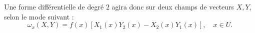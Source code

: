 Une forme différentielle de degré $2$ agira donc sur deux champs de vecteurs $X, Y$, selon le mode suivant :
\[\omega_x(X,Y)=f(x)\left[X_1(x) Y_2(x) - X_2(x)Y_1(x)\right], \quad x \in U.\]


